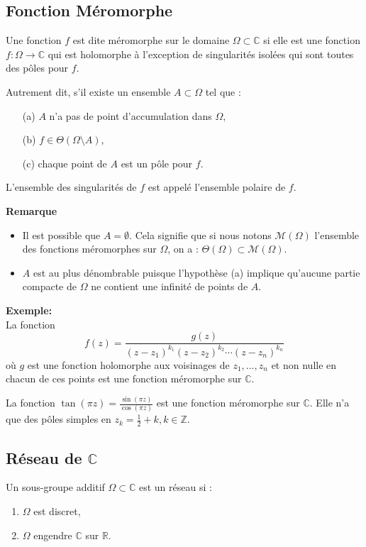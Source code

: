 \documentclass{article}
\begin{document}
\subsection{Fonction Méromorphe}
Une fonction $f$ est dite méromorphe sur le domaine $\Omega \subset \mathbb{C}$ si elle est une fonction $f : \Omega \to \mathbb{C}$ qui est holomorphe à l'exception de singularités isolées qui sont toutes des pôles pour $f$.

Autrement dit, s'il existe un ensemble $A \subset \Omega$ tel que :
\begin{itemize}
    \item[(a)] $A$ n'a pas de point d'accumulation dans $\Omega$,
    \item[(b)] $f \in \Theta(\Omega \setminus A)$,
    \item[(c)] chaque point de $A$ est un pôle pour $f$.
\end{itemize}
L'ensemble des singularités de $f$ est appelé l'ensemble polaire de $f$.

\textbf{Remarque}
\begin{itemize}
    \item Il est possible que $A = \emptyset$. Cela signifie que si nous notons $\mathcal{M}(\Omega)$ l'ensemble des fonctions méromorphes sur $\Omega$, on a : $\Theta(\Omega) \subset \mathcal{M}(\Omega)$.
    \item $A$ est au plus dénombrable puisque l'hypothèse (a) implique qu'aucune partie compacte de $\Omega$ ne contient une infinité de points de $A$.
\end{itemize}

\textbf{Exemple:} \\
La fonction 
\[
f(z) = \frac{g(z)}{(z - z_1)^{k_1}(z - z_2)^{k_2} \cdots (z - z_n)^{k_n}}
\]
où $g$ est une fonction holomorphe aux voisinages de $z_1, \ldots, z_n$ et non nulle en chacun de ces points est une fonction méromorphe sur $\mathbb{C}$.

La fonction $\tan(\pi z) = \frac{\sin(\pi z)}{\cos(\pi z)}$ est une fonction méromorphe sur $\mathbb{C}$. Elle n'a que des pôles simples en $z_k = \frac{1}{2} + k, k \in \mathbb{Z}$.

\subsection{Réseau de $ \mathbb{C}$ }
Un sous-groupe additif $\Omega \subset \mathbb{C}$ est un réseau si :
\begin{enumerate}
    \item $\Omega$ est discret,
    \item $\Omega$ engendre $\mathbb{C}$ sur $\mathbb{R}$.
\end{enumerate}
\end{document}

